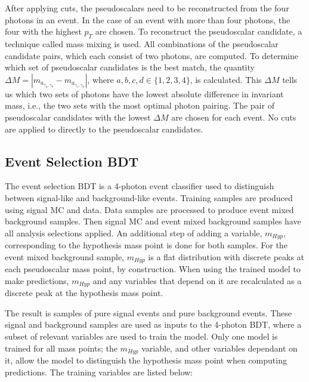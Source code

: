\documentclass[12pt]{article}
\begin{document}
After applying cuts, the pseudoscalars need to be reconstructed from the four photons in an event. In the case of an event with more than four photons, the four with the highest $p_T$ are chosen. To reconstruct the pseudoscalar candidate, a technique called mass mixing is used. All combinations of the pseudoscalar candidate pairs, which each consist of two photons, are computed. To determine which set of pseudoscalar candidates is the best match, the quantity $\Delta M = |m_{a_{\gamma_{a}, \gamma_{b}}} - m_{a_{\gamma_{c}, \gamma_{d}}}|$, where $a,b,c,d \in \{1,2,3,4\}$, is calculated. This $\Delta M$ tells us which two sets of photons have the lowest absolute difference in invariant mass, i.e., the two sets with the most optimal photon pairing. The pair of pseudoscalar candidates with the lowest $\Delta M$ are chosen for each event. No cuts are applied to directly to the pseudoscalar candidates.\par

\subsection{Event Selection BDT}
The event selection BDT is a 4-photon event classifier used to distinguish between signal-like and background-like events. Training samples are produced using signal MC and data. Data samples are processed to produce event mixed background samples. Then signal MC and event mixed background samples have all analysis selections applied. An additional step of adding a variable, $m_{Hyp}$, corresponding to the hypothesis mass point is done for both samples. For the event mixed background sample, $m_{Hyp}$ is a flat distribution with discrete peaks at each pseudoscalar mass point, by construction. When using the trained model to make predictions, $m_{Hyp}$ and any variables that depend on it are recalculated as a discrete peak at the hypothesis mass point.\par

The result is samples of pure signal events and pure background events. These signal and background samples are used as inputs to the 4-photon BDT, where a subset of relevant variables are used to train the model. Only one model is trained for all mass points; the $m_{Hyp}$ variable, and other variables dependant on it, allow the model to distinguish the hypothesis mass point when computing predictions. The training variables are listed below:\par
\end{document}
